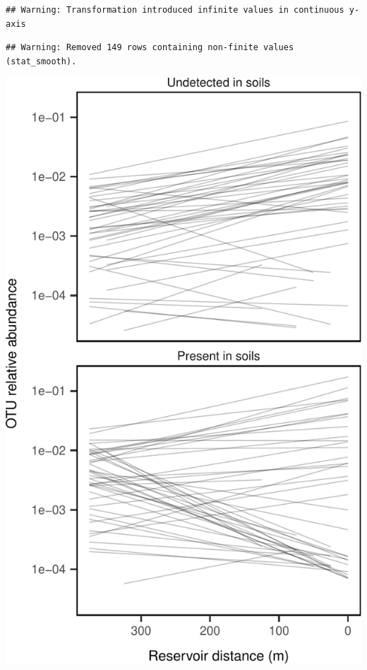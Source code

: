 \documentclass[]{article}
\begin{document}
\begin{verbatim}
## Warning: Transformation introduced infinite values in continuous y-axis
\end{verbatim}

\begin{verbatim}
## Warning: Removed 149 rows containing non-finite values (stat_smooth).
\end{verbatim}

\begin{center}\includegraphics{ReservoirGradient_files/figure-latex/coreplot-1} \end{center}
\end{document}
